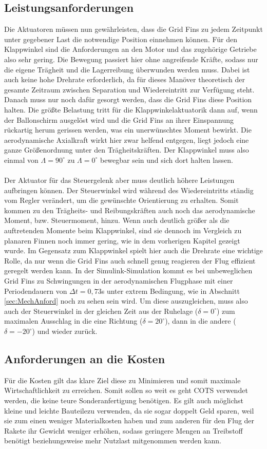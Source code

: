 \subsection{Leistungsanforderungen}
Die Aktuatoren müssen nun gewährleisten, dass die Grid Fins zu jedem Zeitpunkt unter gegebener Last die notwendige Position einnehmen können. Für den Klappwinkel sind die Anforderungen an den Motor und das zugehörige Getriebe also sehr gering. Die Bewegung passiert hier ohne angreifende Kräfte, sodass nur die eigene Trägheit und die Lagerreibung überwunden werden muss. Dabei ist auch keine hohe Drehrate erforderlich, da für dieses Manöver theoretisch der gesamte Zeitraum zwischen Separation und Wiedereintritt zur Verfügung steht. Danach muss nur noch dafür gesorgt werden, dass die Grid Fins diese Position halten. Die größte Belastung tritt für die Klappwinkelaktuatorik dann auf, wenn der Ballonschirm ausgelöst wird und die Grid Fins an ihrer Einspannung rückartig herum gerissen werden, was ein unerwünschtes Moment bewirkt. Die aerodynamische Axialkraft wirkt hier zwar helfend entgegen, liegt jedoch eine ganze Größenordnung unter den Trägheitskräften.
Der Klappwinkel muss also einmal von $\Lambda=90^\circ$ zu $\Lambda=0^\circ$ bewegbar sein und sich dort halten lassen.
\\~\\
Der Aktuator für das Steuergelenk aber muss deutlich höhere Leistungen aufbringen können. Der Steuerwinkel wird während des Wiedereintritts ständig vom Regler verändert, um die gewünschte Orientierung zu erhalten. Somit kommen zu den Trägheits- und Reibungskräften auch noch das aerodynamische Moment, bzw. Steuermoment, hinzu. Wenn auch deutlich größer als die auftretenden Momente beim Klappwinkel, sind sie dennoch im Vergleich zu planaren Finnen noch immer gering, wie in dem vorherigen Kapitel gezeigt wurde. Im Gegensatz zum Klappwinkel spielt hier auch die Drehrate eine wichtige Rolle, da nur wenn die Grid Fins auch schnell genug reagieren der Flug effizient geregelt werden kann. In der Simulink-Simulation kommt es bei unbeweglichen Grid Fins zu Schwingungen in der aerodynamischen Flugphase mit einer Periodendauern von $\Delta t=0,73$s unter extrem Bedingung, wie in Abschnitt \ref{sec:MechAnford} noch zu sehen sein wird. Um diese auszugleichen, muss also auch der Steuerwinkel in der gleichen Zeit aus der Ruhelage ($\delta = 0^\circ$) zum maximalen Ausschlag in die eine Richtung ($\delta = 20^\circ$), dann in die andere ($\delta = -20^\circ$) und wieder zurück.
\subsection{Anforderungen an die Kosten}
Für die Kosten gilt das klare Ziel diese zu Minimieren und somit maximale Wirtschaftlichkeit zu erreichen. Somit sollen so weit es geht COTS verwendet werden, die keine teure Sonderanfertigung benötigen. Es gilt auch möglichst kleine und leichte Bauteilezu verwenden, da sie sogar doppelt Geld sparen, weil sie zum einen weniger Materialkosten haben und zum anderen für den Flug der Rakete ihr Gewicht weniger erhöhen, sodass geringere Mengen an Treibstoff benötigt beziehungsweise mehr Nutzlast mitgenommen werden kann.
